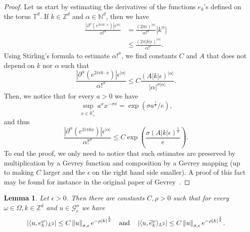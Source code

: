 \documentclass[10pt]{amsart}
\newtheorem{lemm}[theo]{Lemma}\newtheorem{prop}[theo]{Proposition}\newtheorem{coro}[theo]{Corollary}\newtheorem{conj}[theo]{Conjecture}
\theoremstyle{definition}\newtheorem{defi}[theo]{Definition}\newtheorem{rema}[theo]{Remark}\newtheorem{exam}[theo]{Example}\newtheorem{exem}[theo]{Example}\newtheorem{nota}[theo]{Notation}
\newcommand{\p}[1]{\left(#1\right)}
\newcommand{\n}[1]{\left\|#1\right\|}
\newcommand{\va}[1]{\left|#1\right|}
\newcommand{\brac}[1]{\langle #1 \rangle}
\newcommand{\clG}{\mathcal{G}}
\newcommand{\bbZ}{\mathbb{Z}}
\newcommand{\bbT}{\mathbb{T}}
\newcommand{\bbN}{\mathbb{N}}
\newcommand{\bbR}{\mathbb{R}}
\let\oldtilde\tilde
\renewcommand*{\tilde}[1]{\mathchoice{\widetilde{#1}}{\widetilde{#1}}{\oldtilde{#1}}{\oldtilde{#1}}}
\begin{document}
\begin{proof}
Let us start by estimating the derivatives of the functions $e_k$'s defined on the torus $\bbT^d$. If $k \in \bbZ^d$ and $\alpha \in \bbN^d$, then we have
\begin{equation*}
\begin{split}
\frac{\va{\partial^\alpha \left(e^{2 i \pi k \cdot x}\right)}\epsilon^{\va{\alpha}}}{\alpha!^\sigma} & = \frac{(2 \pi \epsilon)^{\va{\alpha}}}{\alpha!^\sigma} |k^\alpha| \\
& \leq \frac{(2 \pi \va{k} \epsilon)^{\va{\alpha}}}{\alpha!^\sigma}.
\end{split}
\end{equation*}
Using Stirling's formula to estimate $\alpha!^\sigma$, we find constants $C$ and $A$ that does not depend on $k$ nor $\alpha$ such that
\begin{equation*}
\frac{\va{\partial^\alpha \left(e^{2 i \pi k \cdot x}\right)}\epsilon^{\va{\alpha}}}{\alpha!^\sigma} \leq C \frac{(A \va{k} \epsilon)^{\va{\alpha}}}{\va{\alpha}^{\sigma \va{\alpha}}}.
\end{equation*}
Then, we notice that for every $a > 0$ we have
\begin{equation*}
\sup_{x \in \bbR_+^*} a^x x^{- \sigma x} = \exp\p{\sigma a^{\frac{1}{\sigma}}/e},
\end{equation*}
and thus
\begin{equation*}
\frac{\va{\partial^\alpha \left(e^{2 i \pi k x}\right)}\epsilon^{\va{\alpha}}}{\alpha!^\sigma} \leq C \exp\p{\frac{\sigma (A \va{k} \epsilon)^{\frac{1}{\sigma}}}{e}}.
\end{equation*}
To end the proof, we only need to notice that such estimates are preserved by multiplication by a Gevrey function and composition by a Gevrey mapping (up to making $C$ larger and the $\epsilon$ on the right hand side smaller). A proof of this fact may be found for instance in the original paper of Gevrey~\cite{GevreyOG}.
\end{proof}

\begin{lemm}\label{lemma:dual_ekomega_gevrey}
Let $\epsilon > 0$. Then there are constants $C,\rho > 0$ such that for every $\omega \in \Omega, k \in \bbZ^d$ and $u \in \clG^\sigma_\epsilon$ we have
\begin{equation*}
\va{\brac{u,e_k^\omega}_{L^2}} \leq C \n{u}_{\sigma,\epsilon} e^{- \rho \va{k}^{\frac{1}{\sigma}}} \quad \text{and} \quad \va{\brac{u,\tilde{e}_k^\omega}_{L^2}} \leq C \n{u}_{\sigma,\epsilon} e^{- \rho \va{k}^{\frac{1}{\sigma}}}.
\end{equation*}
\end{lemm}
\end{document}
